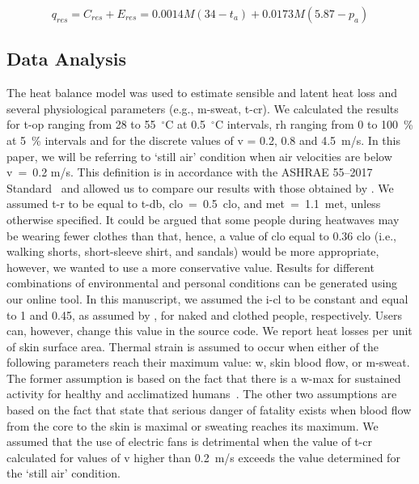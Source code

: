 \begin{equation}
    q_{res} = C_{res} + E_{res} = 0.0014M(34-t_{a}) + 0.0173M(5.87-p_{a})\label{eq:respiratory-losses}
\end{equation}

\subsection{Data Analysis}\label{subsec:data-analysis}

The heat balance model was used to estimate sensible and latent heat loss and several physiological parameters (e.g., \ac{m-sweat}, \ac{t-cr}).
We calculated the results for \ac{t-op} ranging from 28 to 55~$^{\circ}$C at 0.5~$^{\circ}$C intervals, \ac{rh} ranging from 0 to 100~\% at 5~\% intervals and for the discrete values of \ac{v} = 0.2, 0.8 and 4.5~m/s.
In this paper, we will be referring to `still air' condition when air velocities are below \ac{v}~=~0.2 m/s.
This definition is in accordance with the ASHRAE 55--2017 Standard~\cite{ashrae552017} and allowed us to compare our results with those obtained by .
We assumed \ac{t-r} to be equal to \ac{t-db}, \ac{clo}~=~0.5~clo, and \ac{met}~=~1.1~met, unless otherwise specified.
It could be argued that some people during heatwaves may be wearing fewer clothes than that, hence, a value of \ac{clo} equal to 0.36 clo (i.e., walking shorts, short-sleeve shirt, and sandals) would be more appropriate, however, we wanted to use a more conservative value.
Results for different combinations of environmental and personal conditions can be generated using our online tool.
In this manuscript, we assumed the \ac{i-cl} to be constant and equal to 1 and 0.45, as assumed by , for naked and clothed people, respectively.
Users can, however, change this value in the source code.
We report heat losses per unit of skin surface area.
Thermal strain is assumed to occur when either of the following parameters reach their maximum value: \ac{w}, skin blood flow, or \ac{m-sweat}.
The former assumption is based on the fact that there is a \ac{w-max} for sustained activity for healthy and acclimatized humans~\cite{ASHRA2017}.
The other two assumptions are based on the fact that  state that serious danger of fatality exists when blood flow from the core to the skin is maximal or sweating reaches its maximum.
We assumed that the use of electric fans is detrimental when the value of \ac{t-cr} calculated for values of \ac{v} higher than 0.2~m/s exceeds the value determined for the `still air' condition.

